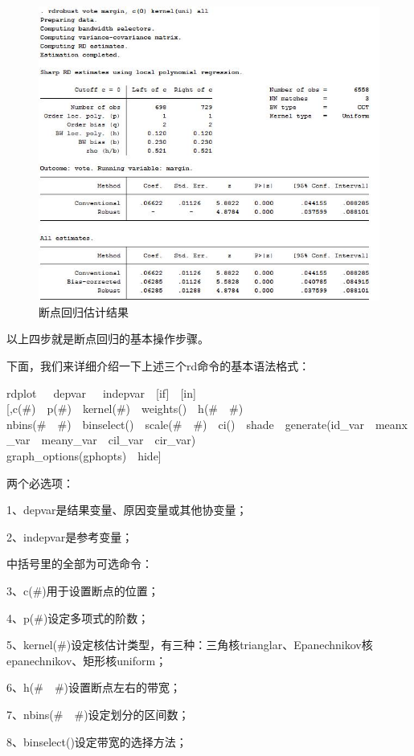 \documentclass[cn,10pt,math=newtx,citestyle=gb7714-2015,bibstyle=gb7714-2015]{elegantbook}
\begin{document}
	\begin{figure}[htbp]
		\centering
		\includegraphics[width=1\textwidth]{rdresults.jpg}
		\caption{断点回归估计结果}\label{fig:digit}
	\end{figure}
	
	以上四步就是断点回归的基本操作步骤。
	
	下面，我们来详细介绍一下上述三个rd命令的基本语法格式：
	
	rdplot~~~depvar~~~indepvar~~[if]~~[in][,c(\#)~~p(\#)~~kernel(\#)~~weights()~~h(\#~~\#)~~\\
	nbins(\#~~\#)~~binselect()~~scale(\#~~\#)~~ci()~~shade~~generate(id\_var~~meanx\_var~~meany\_var~~cil\_var~~cir\_var)~~\\
	graph\_options(gphopts)~~hide]
	
	两个必选项：
	
	1、depvar是结果变量、原因变量或其他协变量；
	
	2、indepvar是参考变量；
	
	中括号里的全部为可选命令：
	
	3、c(\#)用于设置断点的位置；
	
	4、p(\#)设定多项式的阶数；
	
	5、kernel(\#)设定核估计类型，有三种：三角核trianglar、Epanechnikov核epanechnikov、矩形核uniform；
	
	6、h(\#~~\#)设置断点左右的带宽；
	
	7、nbins(\#~~\#)设定划分的区间数；
	
	8、binselect()设定带宽的选择方法；
	
\end{document}

